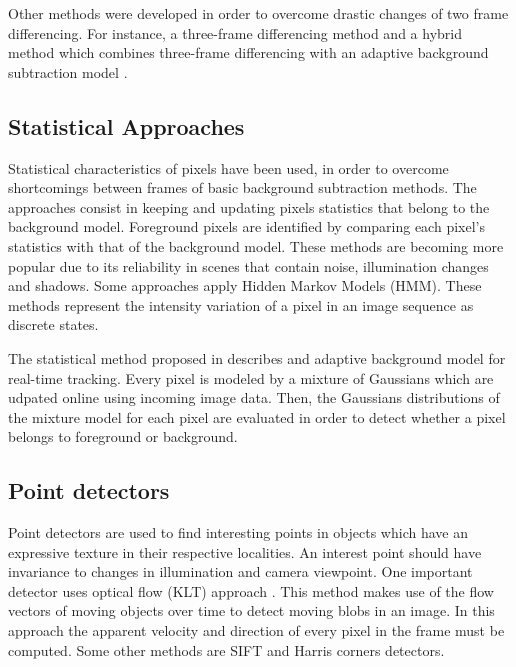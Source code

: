Other methods were developed in order to overcome drastic changes of two frame
differencing. For instance, a three-frame differencing method \cite{Wang2003} 
and a hybrid method which combines three-frame differencing with an adaptive
background subtraction model \cite{Collins2000}.

\subsection{Statistical Approaches}

Statistical characteristics of pixels have been used, in order to overcome
shortcomings between frames of basic background subtraction methods. The
approaches consist in keeping and updating pixels statistics that belong to the
background model. Foreground pixels are identified by comparing each pixel's
statistics with that of the background model. These methods are becoming more
popular due to its reliability in scenes that contain noise, illumination
changes and shadows. Some approaches apply Hidden Markov Models (HMM). These
methods \cite{Stenger2001,Rittscher2000} represent the intensity variation of a
pixel in an image sequence as discrete states.

The statistical method proposed in \cite{Pham2010} describes and adaptive
background model for real-time tracking. Every pixel is modeled by a mixture of
Gaussians which are udpated online using incoming image data. Then, the
Gaussians distributions of the mixture model for each pixel are evaluated
in order to detect whether a pixel belongs to foreground or background.

\subsection{Point detectors}

Point detectors are used to find interesting points in objects which have an
expressive texture in their respective localities. An interest point should
have invariance to changes in illumination and camera viewpoint. One important
detector uses optical flow (KLT) approach \cite{Shi1994}. This method makes use
of the flow vectors of moving objects over time to detect moving blobs in an
image. In this approach the apparent velocity and direction of every pixel in
the frame must be computed. Some other methods are SIFT \cite{Lowe2004b} and
Harris \cite{Harris1988} corners detectors.

